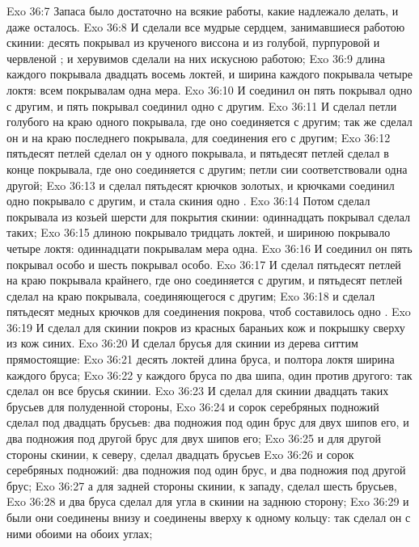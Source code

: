 \vs Exo 36:7 Запаса было достаточно на всякие работы, какие надлежало делать, и даже осталось.
\rsbpar\vs Exo 36:8 И сделали все мудрые сердцем, занимавшиеся работою скинии: десять покрывал из крученого виссона и из голубой, пурпуровой и червленой ; и херувимов сделали на них искусною работою;
\vs Exo 36:9 длина каждого покрывала двадцать восемь локтей, и ширина каждого покрывала четыре локтя: всем покрывалам одна мера.
\vs Exo 36:10 И соединил он пять покрывал одно с другим, и  пять покрывал соединил одно с другим.
\vs Exo 36:11 И сделал петли голубого  на краю одного покрывала, где оно соединяется с другим; так же сделал он и на краю последнего покрывала, для соединения его с другим;
\vs Exo 36:12 пятьдесят петлей сделал он у одного покрывала, и пятьдесят петлей сделал в конце покрывала, где оно соединяется с другим; петли сии соответствовали одна другой;
\vs Exo 36:13 и сделал пятьдесят крючков золотых, и крючками соединил одно покрывало с другим, и стала скиния одно .
\rsbpar\vs Exo 36:14 Потом сделал покрывала из козьей шерсти для покрытия скинии: одиннадцать покрывал сделал таких;
\vs Exo 36:15 длиною покрывало тридцать локтей, и шириною покрывало четыре локтя: одиннадцати покрывалам мера одна.
\vs Exo 36:16 И соединил он пять покрывал особо и шесть покрывал особо.
\vs Exo 36:17 И сделал пятьдесят петлей на краю покрывала крайнего, где оно соединяется с другим, и пятьдесят петлей сделал на краю покрывала, соединяющегося с другим;
\vs Exo 36:18 и сделал пятьдесят медных крючков для соединения покрова, чтоб составилось одно .
\vs Exo 36:19 И сделал для скинии покров из красных бараньих кож и покрышку сверху из кож синих.
\rsbpar\vs Exo 36:20 И сделал брусья для скинии из дерева ситтим прямостоящие:
\vs Exo 36:21 десять локтей длина бруса, и полтора локтя ширина каждого бруса;
\vs Exo 36:22 у каждого бруса по два шипа, один против другого: так сделал он все брусья скинии.
\vs Exo 36:23 И сделал для скинии двадцать таких брусьев для полуденной стороны,
\vs Exo 36:24 и сорок серебряных подножий сделал под двадцать брусьев: два подножия под один брус для двух шипов его, и два подножия под другой брус для двух шипов его;
\vs Exo 36:25 и для другой стороны скинии, к северу, сделал двадцать брусьев
\vs Exo 36:26 и сорок серебряных подножий: два подножия под один брус, и два подножия под другой брус;
\vs Exo 36:27 а для задней стороны скинии, к западу, сделал шесть брусьев,
\vs Exo 36:28 и два бруса сделал для угла в скинии на заднюю сторону;
\vs Exo 36:29 и были они соединены внизу и соединены вверху к одному кольцу: так сделал он с ними обоими на обоих углах;
